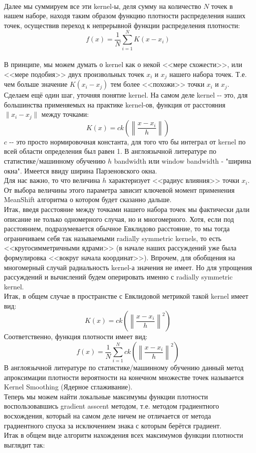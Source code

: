 \documentclass[11pt]{article}
\begin{document}
    \begin{center}
    \end{center}
    { \hspace*{\fill} \\}
    
    Далее мы суммируем все эти kernel-ы, деля сумму на количество $N$ точек
в нашем наборе, находя таким образом функцию плотности распределения
наших точек, осуществив переход к непрерывной функции распределения
плотности: \[ f(x) = \frac{1}{N}\sum\limits_{i = 1}^{N}K(x - x_i) \]
\\ В принципе, мы можем думать о kernel как о некой
<<мере схожести>>, или <<мере подобия>> двух произвольных
точек $x_i$ и $x_j$ нашего набора точек. Т.е. чем больше значение
$K(x_i - x_j)$ тем более <<похожи>> точки $x_i$ и $x_j$.
\\ Сделаем ещё один шаг, уточняя понятие kernel. На самом
деле kernel -\/- это, для большинства применяемых на практике kernel-ов,
функция от расстояния $\|x_i - x_j\|$ между точками:
\[ K(x) = ck\left(\left\|\frac{x - x_i}{h}\right\|\right)\] $c$ -\/- это
просто нормировочная константа, для того что бы интеграл от kernel по
всей области определения был равен 1. В англоязычной литературе по
статистике/машинному обучению $h$ bandwidth или window bandwidth -
"ширина окна". Имеется ввиду ширина Парзеновского окна.
\\ Для нас важно, то что величина $h$ характеризует
<<радиус влияния>> точки $x_i$. От выбора величины этого параметра
зависит ключевой момент применения MeanShift алгоритма о котором будет
сказанно дальше. \\ Итак, введя расстояние между точками
нашего набора точек мы фактически дали описание не только одномерного
случая, но и многомерного. Хотя, если под расстоянием, подразумевается
обычное Евклидово расстояние, то мы тогда ограничиваем себя так
называемыми radially symmetric kernels, то есть
<<кругосимметричными ядрами>> (в начале наших рассуждений уже была
формулировка <<вокруг начала координат>>). Впрочем, для обобщения
на многомерный случай радиальность kernel-а значения не имеет. Но для
упрощения рассуждений и вычислений будем оперировать именно с radially
symmetric kernel. \\ Итак, в общем случае в пространстве с
Евклидовой метрикой такой kernel имеет вид: \[
K(x) = ck\left(\left\|\frac{x - x_i}{h}\right\|^2\right)
\] Соответственно, функция плотности имеет вид: \[
f(x) = \frac{1}{N}\sum\limits_{i = 1}^{N}ck\left(\left\|\frac{x - x_i}{h}\right\|^2\right)
\] В англоязычной литературе по статистике/машинному обучению данный
метод апроксимации плотности вероятности на конечном множестве точек
называется Kernel Smoothing (Ядерное сглаживание).
\\ Теперь мы можем найти локальные максимумы функции
плотности воспользовавшись gradient asscent методом, т.е. методом
градиентного восхождения, который на самом деле ничем не отличается от
метода градиентного спуска за исключением знака с которым берётся
градиент. \\ Итак в общем виде алгоритм нахождения всех
максимумов функции плотности выглядит так:
\end{document}
